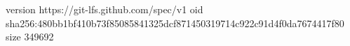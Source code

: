 version https://git-lfs.github.com/spec/v1
oid sha256:480bb1bf410b73f85085841325dcf871450319714c922c91d4f0da7674417f80
size 349692
